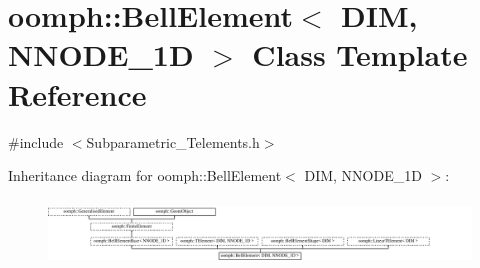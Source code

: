 \hypertarget{classoomph_1_1BellElement}{}\section{oomph\+:\+:Bell\+Element$<$ D\+IM, N\+N\+O\+D\+E\+\_\+1D $>$ Class Template Reference}
\label{classoomph_1_1BellElement}


{\ttfamily \#include $<$Subparametric\+\_\+\+Telements.\+h$>$}

Inheritance diagram for oomph\+:\+:Bell\+Element$<$ D\+IM, N\+N\+O\+D\+E\+\_\+1D $>$\+:\begin{figure}[H]
\begin{center}
\leavevmode
\includegraphics[height=1.777778cm]{classoomph_1_1BellElement}
\end{center}
\end{figure}
